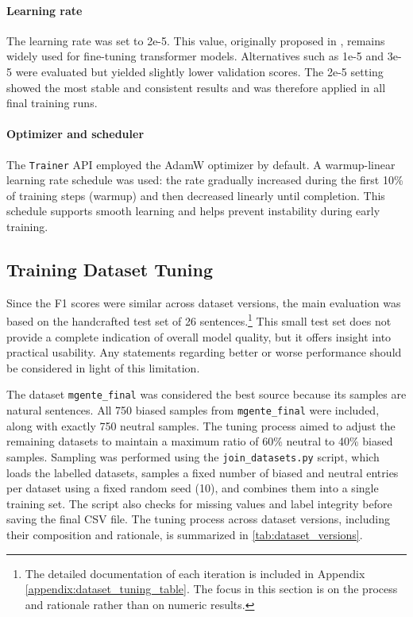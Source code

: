     \paragraph{Learning rate} The learning rate was set to 2e-5. This value, originally proposed in \textcite{devlinBERTPretrainingDeep2019}, remains widely used for fine-tuning transformer models. Alternatives such as 1e-5 and 3e-5 were evaluated but yielded slightly lower validation scores. The 2e-5 setting showed the most stable and consistent results and was therefore applied in all final training runs.

    \paragraph{Optimizer and scheduler} The \texttt{Trainer} API employed the AdamW optimizer by default. A warmup-linear learning rate schedule was used: the rate gradually increased during the first 10\% of training steps (warmup) and then decreased linearly until completion. This schedule supports smooth learning and helps prevent instability during early training.

\subsection{Training Dataset Tuning} \label{subsection:training_dataset_tuning}
    Since the F1 scores were similar across dataset versions, the main evaluation was based on the handcrafted test set of 26 sentences.\footnote{The detailed documentation of each iteration is included in Appendix \ref{appendix:dataset_tuning_table}. The focus in this section is on the process and rationale rather than on numeric results.} This small test set does not provide a complete indication of overall model quality, but it offers insight into practical usability. Any statements regarding better or worse performance should be considered in light of this limitation.

    The dataset \texttt{mgente\_final} was considered the best source because its samples are natural sentences. All 750 biased samples from \texttt{mgente\_final} were included, along with exactly 750 neutral samples. The tuning process aimed to adjust the remaining datasets to maintain a maximum ratio of 60\% neutral to 40\% biased samples. Sampling was performed using the \texttt{join\_datasets.py} script, which loads the labelled datasets, samples a fixed number of biased and neutral entries per dataset using a fixed random seed (10), and combines them into a single training set. The script also checks for missing values and label integrity before saving the final CSV file. The tuning process across dataset versions, including their composition and rationale, is summarized in \autoref{tab:dataset_versions}.

